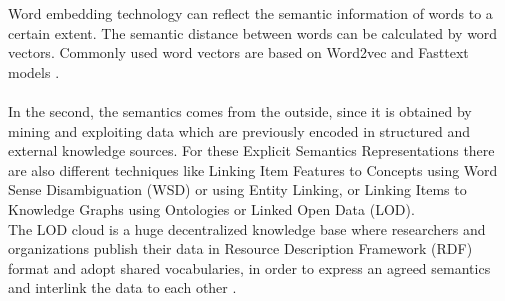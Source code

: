\documentclass[\myFontSize,oneside,english,hidelinks,a4paper]{article}
\begin{document}
Word embedding technology can reflect the semantic information of words to a certain extent. The semantic distance between words can be calculated by word vectors. Commonly used word vectors are based on Word2vec and Fasttext models \cite{Huang2023}.\\\\
%
In the second, the semantics comes from the outside, since it is obtained by mining and exploiting data
which are previously encoded in structured and external knowledge sources. For these Explicit Semantics Representations there are also different techniques like Linking Item Features to Concepts using Word Sense Disambiguation (WSD) or using Entity Linking, or Linking Items to Knowledge Graphs using Ontologies or Linked Open Data (LOD). \cite{Musto2022251} \\
The LOD cloud is a huge decentralized knowledge base where researchers and organizations publish their data in Resource Description Framework (RDF) format and adopt shared vocabularies, in order to express an agreed semantics and interlink the data to each other \cite{Musto2017405}.\\
%
%
%
\end{document}
